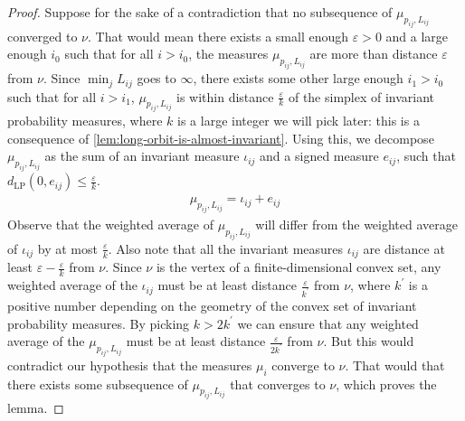 \documentclass[12pt, reqno]{amsart}
\begin{document}
\begin{proof}
  Suppose for the sake of a contradiction that no subsequence of $\mu_{p_{ij}, L_{ij}}$ converged to $\nu$.
  That would mean there exists a small enough $\varepsilon > 0$ and a large enough $i_0$ such that for all $i > i_0$, the measures $\mu_{p_{ij}, L_{ij}}$ are more than distance $\varepsilon$ from $\nu$.
  Since $\min_{j} L_{ij}$ goes to $\infty$, there exists some other large enough $i_1 > i_0$ such that for all $i > i_1$, $\mu_{p_{ij}, L_{ij}}$ is within distance $\frac{\varepsilon}{k}$ of the simplex of invariant probability measures, where $k$ is a large integer we will pick later: this is a consequence of \autoref{lem:long-orbit-is-almost-invariant}.
  Using this, we decompose $\mu_{p_{ij}, L_{ij}}$ as the sum of an invariant measure $\iota_{ij}$ and a signed measure $e_{ij}$, such that $d_{\mathrm{LP}}(0, e_{ij}) \leq \frac{\varepsilon}{k}$.
  \begin{align*}
    \mu_{p_{ij}, L_{ij}} = \iota_{ij} + e_{ij}
  \end{align*}
  Observe that the weighted average of $\mu_{p_{ij}, L_{ij}}$ will differ from the weighted average of $\iota_{ij}$ by at most $\frac{\varepsilon}{k}$.
  Also note that all the invariant measures $\iota_{ij}$ are distance at least $\varepsilon - \frac{\varepsilon}{k}$ from $\nu$.
  Since $\nu$ is the vertex of a finite-dimensional convex set, any weighted average of the $\iota_{ij}$ must be at least distance $\frac{\varepsilon}{k^{\prime}}$ from $\nu$, where $k^{\prime}$ is a positive number depending on the geometry of the convex set of invariant probability measures.
  By picking $k > 2k^{\prime}$ we can ensure that any weighted average of the $\mu_{p_{ij}, L_{ij}}$ must be at least distance $\frac{\varepsilon}{2k^{\prime}}$ from $\nu$.
  But this would contradict our hypothesis that the measures $\mu_i$ converge to $\nu$.
  That would that there exists some subsequence of $\mu_{p_{ij}, L_{ij}}$ that converges to $\nu$, which proves the lemma.
\end{proof}
\end{document}
